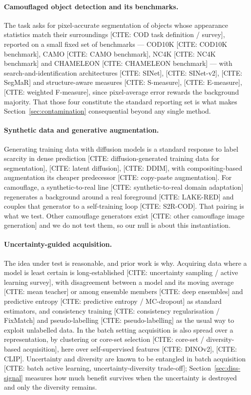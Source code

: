 \documentclass{article} %
\begin{document}
\paragraph{Camouflaged object detection and its benchmarks.} The task asks for pixel-accurate
segmentation of objects whose appearance statistics match their surroundings
[CITE: COD task definition / survey], reported on a small fixed set of benchmarks ---
COD10K [CITE: COD10K benchmark], CAMO [CITE: CAMO benchmark], NC4K [CITE: NC4K benchmark] and
CHAMELEON [CITE: CHAMELEON benchmark] --- with search-and-identification architectures [CITE: SINet], [CITE: SINet-v2], [CITE: SegMaR] and
structure-aware measures [CITE: S-measure], [CITE: E-measure], [CITE: weighted F-measure], since
pixel-average error rewards the background majority. That those four constitute the standard reporting
set is what makes Section~\ref{sec:contamination} consequential beyond any single method.

\paragraph{Synthetic data and generative augmentation.} Generating training data with diffusion models
is a standard response to label scarcity in dense prediction
[CITE: diffusion-generated training data for segmentation], [CITE: latent diffusion], [CITE: DDIM],
with compositing-based augmentation its cheaper predecessor [CITE: copy-paste augmentation]. For
camouflage, a synthetic-to-real line [CITE: synthetic-to-real domain adaptation] regenerates a
background around a real foreground [CITE: LAKE-RED] and couples that generator to a self-training
loop [CITE: S2R-COD]. That pairing is what we test. Other camouflage generators exist
[CITE: other camouflage image generation] and we do not test them, so our null is about this
instantiation.

\paragraph{Uncertainty-guided acquisition.} The idea under test is reasonable, and prior work is why.
Acquiring data where a model is least certain is long-established
[CITE: uncertainty sampling / active learning survey], with disagreement between a model and its
moving average [CITE: mean teacher] or among ensemble members [CITE: deep ensembles] and predictive
entropy [CITE: predictive entropy / MC-dropout] as standard estimators, and consistency training
[CITE: consistency regularisation / FixMatch] and pseudo-labelling [CITE: pseudo-labelling] as the
usual way to exploit unlabelled data. In the batch setting acquisition is also spread over a representation, by clustering or core-set
selection [CITE: core-set / diversity-based acquisition], here over self-supervised features
[CITE: DINOv2], [CITE: CLIP]. Uncertainty and diversity are known to be entangled in batch acquisition
[CITE: batch active learning, uncertainty-diversity trade-off]; Section~\ref{sec:diss-signal} measures
how much benefit survives when the uncertainty is destroyed and only the diversity remains.
\end{document}
